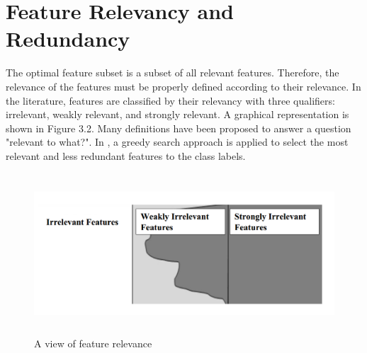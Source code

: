 \documentclass[document.tex]{subfiles}
\begin{document}
\section{Feature Relevancy and Redundancy}
The optimal feature subset is a subset of all relevant features. Therefore, the relevance
of the features must be properly defined according to their relevance. In the literature,
features are classified by their relevancy with three qualifiers: irrelevant, weakly relevant,
and strongly relevant. A graphical representation is shown in Figure 3.2. Many definitions
have been proposed to answer a question "relevant to what?". In \cite{9}, a greedy search approach is applied to select the most relevant and less redundant features to the class labels. 

	\begin{figure}[H]
	\begin{center}
		\includegraphics[height=6.0cm]{imgs/relevance.png}
	\end{center}
	\caption{ A view of feature relevance}
	\label{fig: A view of feature relevance}
    \end{figure}
\end{document}
